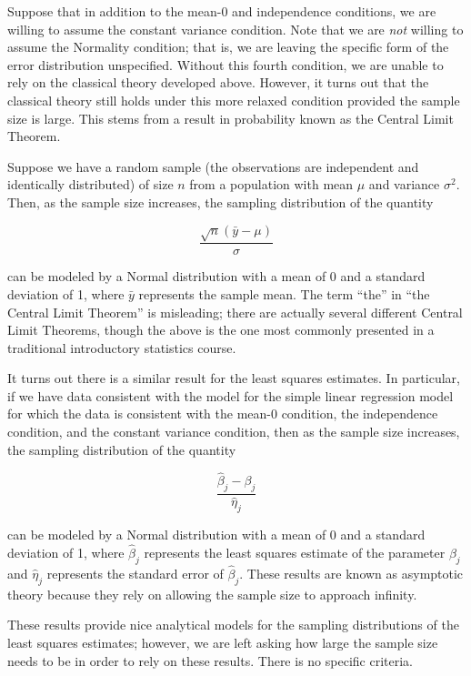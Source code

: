\documentclass[
  letterpaper,
  DIV=11,
  numbers=noendperiod]{scrreprt}
\theoremstyle{definition}
\theoremstyle{definition}
\theoremstyle{plain}
\theoremstyle{remark}
\begin{document}
Suppose that in addition to the mean-0 and independence conditions, we
are willing to assume the constant variance condition. Note that we are
\emph{not} willing to assume the Normality condition; that is, we are
leaving the specific form of the error distribution unspecified. Without
this fourth condition, we are unable to rely on the classical theory
developed above. However, it turns out that the classical theory still
holds under this more relaxed condition provided the sample size is
large. This stems from a result in probability known as the Central
Limit Theorem.

Suppose we have a random sample (the observations are independent and
identically distributed) of size \(n\) from a population with mean
\(\mu\) and variance \(\sigma^2\). Then, as the sample size increases,
the sampling distribution of the quantity

\[\frac{\sqrt{n} \left(\bar{y} - \mu\right)}{\sigma}\]

can be modeled by a Normal distribution with a mean of 0 and a standard
deviation of 1, where \(\bar{y}\) represents the sample mean. The term
``the'' in ``the Central Limit Theorem'' is misleading; there are
actually several different Central Limit Theorems, though the above is
the one most commonly presented in a traditional introductory statistics
course.

It turns out there is a similar result for the least squares estimates.
In particular, if we have data consistent with the model for the simple
linear regression model for which the data is consistent with the mean-0
condition, the independence condition, and the constant variance
condition, then as the sample size increases, the sampling distribution
of the quantity

\[\frac{\widehat{\beta}_j - \beta_j}{\widehat{\eta}_j}\]

can be modeled by a Normal distribution with a mean of 0 and a standard
deviation of 1, where \(\widehat{\beta}_j\) represents the least squares
estimate of the parameter \(\beta_j\) and \(\widehat{\eta}_j\)
represents the standard error of \(\widehat{\beta}_j\). These results
are known as asymptotic theory because they rely on allowing the sample
size to approach infinity.

These results provide nice analytical models for the sampling
distributions of the least squares estimates; however, we are left
asking how large the sample size needs to be in order to rely on these
results. There is no specific criteria.
\end{document}
